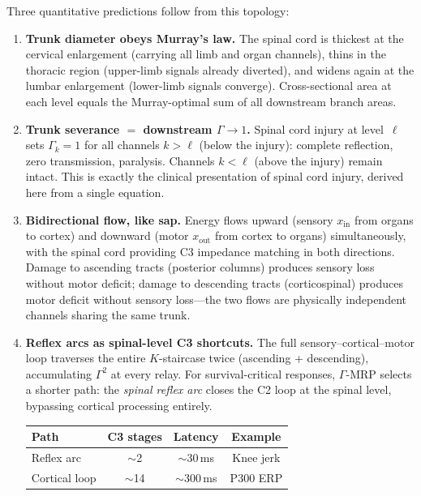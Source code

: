 \documentclass[aps,pre,twocolumn,superscriptaddress,floatfix]{revtex4-2}
\begin{document}
\begin{remark}
Three quantitative predictions follow from this topology:
\begin{enumerate}
  \item \textbf{Trunk diameter obeys Murray's law.}
    The spinal cord is thickest at the cervical
    enlargement (carrying all limb and organ channels),
    thins in the thoracic region (upper-limb signals
    already diverted), and widens again at the lumbar
    enlargement (lower-limb signals converge).
    Cross-sectional area at each level equals the
    Murray-optimal sum of all downstream branch areas.
  \item \textbf{Trunk severance $=$ downstream $\Gamma \to 1$.}
    Spinal cord injury at level~$\ell$ sets
    $\Gamma_{k} = 1$ for all channels $k > \ell$
    (below the injury): complete reflection, zero
    transmission, paralysis.
    Channels $k < \ell$ (above the injury) remain intact.
    This is exactly the clinical presentation of
    spinal cord injury, derived here from a single
    equation.
  \item \textbf{Bidirectional flow, like sap.}
    Energy flows upward (sensory $x_{\text{in}}$
    from organs to cortex) and downward (motor
    $x_{\text{out}}$ from cortex to organs)
    simultaneously, with the spinal cord providing
    C3 impedance matching in both directions.
    Damage to ascending tracts (posterior columns)
    produces sensory loss without motor deficit;
    damage to descending tracts (corticospinal)
    produces motor deficit without sensory loss---the
    two flows are physically independent channels
    sharing the same trunk.
  \item \textbf{Reflex arcs as spinal-level C3 shortcuts.}
    The full sensory--cortical--motor loop traverses the
    entire $K$-staircase twice (ascending + descending),
    accumulating $\Gamma^2$ at every relay.
    For survival-critical responses, $\Gamma$-MRP
    selects a shorter path: the \emph{spinal reflex arc}
    closes the C2 loop at the spinal level, bypassing
    cortical processing entirely.
    \begin{center}
    \begin{tabular}{lccc}
    \toprule
    Path & C3 stages & Latency & Example \\
    \midrule
    Reflex arc & $\sim$2 & $\sim$30\,ms & Knee jerk \\
    Cortical loop & $\sim$14 & $\sim$300\,ms & P300 ERP \\
    \bottomrule
    \end{tabular}
    \end{center}

\end{enumerate}
\end{remark}
\end{document}

